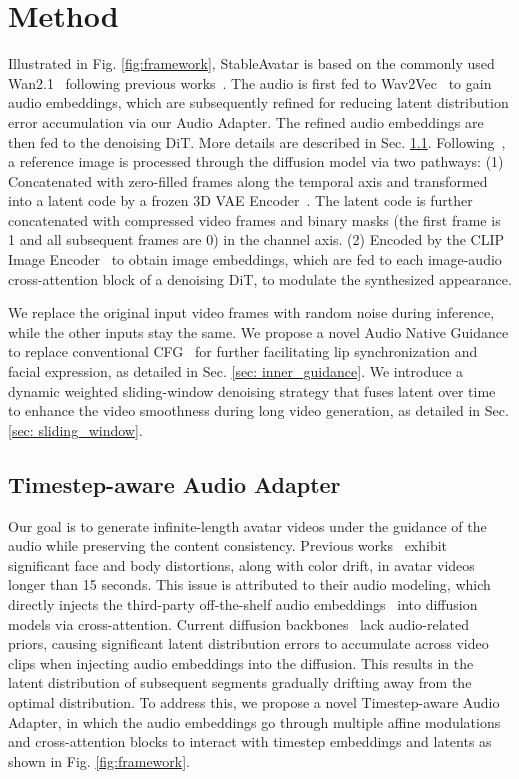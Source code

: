 \section{Method}
\label{sec:method}
Illustrated in Fig. \ref{fig:framework}, StableAvatar is based on the commonly used Wan2.1~\cite{wan2025} following previous works~\cite{wang2025fantasytalking, kong2025let, gan2025omniavatar}.
The audio is first fed to Wav2Vec~\cite{baevski2020wav2vec} to gain audio embeddings, which are subsequently refined for reducing latent distribution error accumulation via our Audio Adapter.
The refined audio embeddings are then fed to the denoising DiT.
More details are described in Sec. \ref{sec: audio_adapter}.
Following~\cite{wan2025}, a reference image is processed through the diffusion model via two pathways: 
(1) Concatenated with zero-filled frames along the temporal axis and transformed into a latent code by a frozen 3D VAE Encoder~\cite{wan2025}. The latent code is further concatenated with compressed video frames and binary masks (the first frame is 1 and all subsequent frames are 0) in the channel axis.
(2) Encoded by the CLIP Image Encoder~\cite{radford2021learning} to obtain image embeddings, which are fed to each image-audio cross-attention block of a denoising DiT, to modulate the synthesized appearance. 

We replace the original input video frames with random noise during inference, while the other inputs stay the same. 
We propose a novel Audio Native Guidance to replace conventional CFG~\cite{ho2022classifier} for further facilitating lip synchronization and facial expression, as detailed in Sec. \ref{sec: inner_guidance}.
We introduce a dynamic weighted sliding-window denoising strategy that fuses latent over time to enhance the video smoothness during long video generation, as detailed in Sec. \ref{sec: sliding_window}.

\subsection{Timestep-aware Audio Adapter}
\label{sec: audio_adapter}
Our goal is to generate infinite-length avatar videos under the guidance of the audio while preserving the content consistency.
Previous works~\cite{cui2025hallo3, wang2025fantasytalking, gan2025omniavatar, chen2025hunyuanvideo, kong2025let, ji2025sonic, meng2025echomimicv2} exhibit significant face and body distortions, along with color drift, in avatar videos longer than 15 seconds. This issue is attributed to their audio modeling, which directly injects the third-party off-the-shelf audio embeddings~\cite{baevski2020wav2vec} into diffusion models via cross-attention.
Current diffusion backbones~\cite{blattmann2023stable, wan2025, kong2024hunyuanvideo} lack audio-related priors, causing significant latent distribution errors to accumulate across video clips when injecting audio embeddings into the diffusion. This results in the latent distribution of subsequent segments gradually drifting away from the optimal distribution. To address this, we propose a novel Timestep-aware Audio Adapter, in which the audio embeddings go through multiple affine modulations and cross-attention blocks to interact with timestep embeddings and latents as shown in Fig. \ref{fig:framework}.


